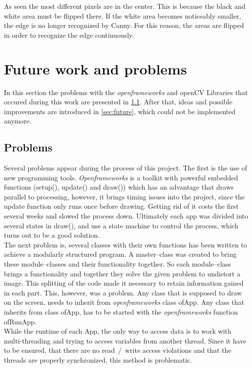 \documentclass[journal,final,a4paper,twoside]{PS}
\begin{document}
As seen the most different pixels are in the center. This is because the black and white area must be flipped there. If the white area becomes noticeably smaller, the edge is no longer recognized by Canny. For this reason, the areas are flipped in order to recognize the edge continuously. 

\section{Future work and problems}
\label{sec:work_probs}
In this section the problems with the \emph{openframeworks} and openCV Libraries that occured during this work are presented in \ref{sec:probs}. After that, ideas and possible improvements are introduced in \ref{sec:future}, which could not be implemented anymore.
\subsection{Problems}
\label{sec:probs}
Several problems appear during the process of this project.
The first is the use of new programming tools. \emph{Openframeworks} is a toolkit with powerful embedded functions (setup(), update() and draw()) which has an advantage that draws parallel to processing, however, it brings timing issues into the project, since the update function only runs once before drawing. Getting rid of it costs the first several weeks and slowed the process down. Ultimately each app was divided into several states in draw(), and use a state machine to control the process, which turns out to be a good solution.  \\
The next problem is, several classes with their own functions has been written to achieve a modularly structured program. A  master--class was created to bring these module--classes and their functionality together. So each module--class brings a functionality and together they solve the given problem to undistort a image. This splitting of the code made it necessary to retain information gained in each part. This, however, was a problem. Any class that is supposed to draw on the screen, needs to inherit from \emph{openframeworks} class ofApp. Any class that inherits from class ofApp, has to be started with the \emph{openframeworks} function ofRunApp.\\
While the runtime of each App, the only way to access data is to work with multi-threading and trying to access variables from another thread. Since it have to be ensured, that there are no read~/~write access violations and that the threads are properly synchronized, this method is problematic. \\
\end{document}

